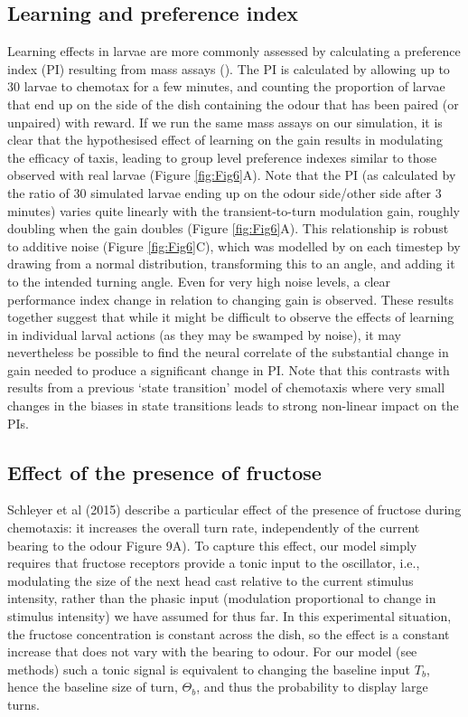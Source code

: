 \documentclass[10pt,a4paper]{article}
\begin{document}
\subsection{Learning and preference index}
Learning effects in larvae are more commonly assessed by calculating a preference index (PI) resulting from mass assays (\citep{gerber2009smelling}). The PI is calculated by allowing up to 30 larvae to chemotax for a few minutes, and counting the proportion of larvae that end up on the side of the dish containing the odour that has been paired (or unpaired) with reward. If we run the same mass assays on our simulation, it is clear that the hypothesised effect of learning on the gain results in modulating the efficacy of taxis, leading to group level preference indexes similar to those observed with real larvae (Figure \ref{fig:Fig6}A). Note that the PI (as calculated by the ratio of 30 simulated larvae ending up on the odour side/other side after 3 minutes) varies quite linearly with the transient-to-turn modulation gain, roughly doubling when the gain doubles (Figure \ref{fig:Fig6}A). This relationship is robust to additive noise (Figure \ref{fig:Fig6}C), which was modelled by on each timestep by drawing from a normal distribution, transforming this to an angle, and adding it to the intended turning angle. Even for very high noise levels, a clear performance index change in relation to changing gain is observed. These results together suggest that while it might be difficult to observe the effects of learning in individual larval actions (as they may be swamped by noise), it may nevertheless be possible to find the neural correlate of the substantial change in gain needed to produce a significant change in PI.
Note that this contrasts with results from a previous `state transition' model of chemotaxis \citep{davies2015model} where very small changes in the biases in state transitions leads to strong non-linear impact on the PIs.

\subsection{Effect of the presence of fructose}
Schleyer et al (2015) describe a particular effect of the presence of fructose during chemotaxis: it increases the overall turn rate, independently of the current bearing to the odour Figure 9A). To capture this effect, our model simply requires that fructose receptors provide a tonic input to the oscillator, i.e., modulating the size of the next head cast relative to the current stimulus intensity, rather than the phasic input (modulation proportional to change in stimulus intensity) we have assumed for thus far. In this experimental situation, the fructose concentration is constant across the dish, so the effect is a constant increase that does not vary with the bearing to odour. For our model (see methods) such a tonic signal is equivalent to changing the baseline input $T_b$, hence the baseline size of turn, $\Theta_b$, and thus the probability to display large turns. 
\end{document}
